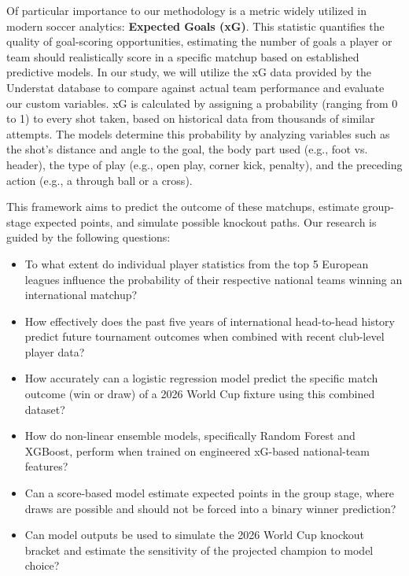 \documentclass[11pt]{article}
\begin{document}
Of particular importance to our methodology is a metric widely utilized in modern soccer analytics: \textbf{Expected Goals (xG)}. This statistic quantifies the quality of goal-scoring opportunities, estimating the number of goals a player or team should realistically score in a specific matchup based on established predictive models. In our study, we will utilize the xG data provided by the Understat database to compare against actual team performance and evaluate our custom variables. xG is calculated by assigning a probability (ranging from 0 to 1) to every shot taken, based on historical data from thousands of similar attempts. The models determine this probability by analyzing variables such as the shot's distance and angle to the goal, the body part used (e.g., foot vs. header), the type of play (e.g., open play, corner kick, penalty), and the preceding action (e.g., a through ball or a cross).


This framework aims to predict the outcome of these matchups, estimate group-stage expected points, and simulate possible knockout paths. Our research is guided by the following questions:
\begin{itemize}
\item To what extent do individual player statistics from the top 5 European leagues influence the probability of their respective national teams winning an international matchup?

\item How effectively does the past five years of international head-to-head history predict future tournament outcomes when combined with recent club-level player data?

\item How accurately can a logistic regression model predict the specific match outcome (win or draw) of a 2026 World Cup fixture using this combined dataset?

\item How do non-linear ensemble models, specifically Random Forest and XGBoost, perform when trained on engineered xG-based national-team features?

\item Can a score-based model estimate expected points in the group stage, where draws are possible and should not be forced into a binary winner prediction?

\item Can model outputs be used to simulate the 2026 World Cup knockout bracket and estimate the sensitivity of the projected champion to model choice?

\end{itemize}
\end{document}
